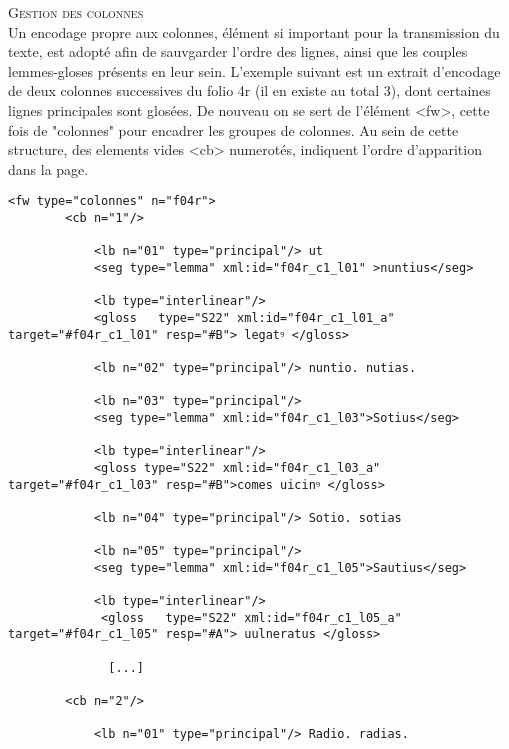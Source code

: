 \documentclass[a4paper, twoside, 12pt]{book}
\begin{document}
\textsc{Gestion des colonnes}\\

Un encodage propre aux colonnes, élément si important pour la transmission du texte, est adopté afin de sauvgarder l'ordre des lignes, ainsi que les couples lemmes-gloses présents en leur sein. L'exemple suivant est un extrait d'encodage de deux colonnes successives  du folio 4r (il en existe au total 3), dont certaines lignes principales sont glosées. De nouveau on se sert de l'élément <fw>, cette fois de \@type "colonnes" pour encadrer les groupes de colonnes. Au sein de cette structure, des elements vides <cb> numerotés, indiquent l'ordre d'apparition dans la page. 

\begin{verbatim} 
<fw type="colonnes" n="f04r">
        <cb n="1"/>
                              
            <lb n="01" type="principal"/> ut 
            <seg type="lemma" xml:id="f04r_c1_l01" >nuntius</seg>
                              
            <lb type="interlinear"/>
            <gloss   type="S22" xml:id="f04r_c1_l01_a" target="#f04r_c1_l01" resp="#B"> legatꝰ </gloss> 
                              
            <lb n="02" type="principal"/> nuntio. nutias. 
               
            <lb n="03" type="principal"/> 
            <seg type="lemma" xml:id="f04r_c1_l03">Sotius</seg>
                              
            <lb type="interlinear"/>
            <gloss type="S22" xml:id="f04r_c1_l03_a" target="#f04r_c1_l03" resp="#B">comes uicinꝰ </gloss>
                              
            <lb n="04" type="principal"/> Sotio. sotias 
                              
            <lb n="05" type="principal"/>
            <seg type="lemma" xml:id="f04r_c1_l05">Sautius</seg>
                              
            <lb type="interlinear"/>
             <gloss   type="S22" xml:id="f04r_c1_l05_a" target="#f04r_c1_l05" resp="#Α"> uulneratus </gloss>
                              
              [...]
              
        <cb n="2"/>
        
            <lb n="01" type="principal"/> Radio. radias.
                                    

\end{verbatim}
\end{document}
